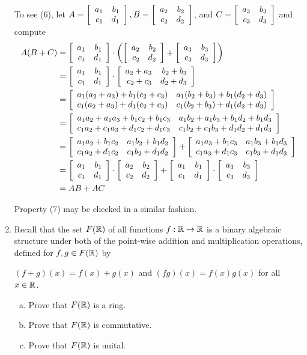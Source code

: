 \documentclass[11pt,fleqn,dvipsnames,usenames]{article}
\begin{document}
\begin{enumerate}[1.]
To see (6), let $A = \MATRIX{rr}{a_{1} & b_{1}\\c_{1} & d_{1}}, B = \MATRIX{rr}{a_{2} & b_{2}\\c_{2} & d_{2}}$, and $C = \MATRIX{rr}{a_{3} & b_{3}\\c_{3} & d_{3}}$ and compute
\begin{align*}
A(B+C) &= \MATRIX{rr}{a_{1} & b_{1}\\c_{1} & d_{1}} \cdot\left(\MATRIX{rr}{a_{2} & b_{2}\\c_{2} & d_{2}} + \MATRIX{rr}{a_{3} & b_{3}\\c_{3} & d_{3}}\right)\\
&= \MATRIX{rr}{a_{1} & b_{1}\\c_{1} & d_{1}} \cdot \MATRIX{rr}{a_{2} + a_{3} & b_{2} + b_{3}\\c_{2} + c_{3} & d_{2} + d_{3}}\\
&= \MATRIX{rr}{a_{1}(a_{2} + a_{3}) + b_{1}(c_{2} + c_{3}) & a_{1}(b_{2} + b_{3}) + b_{1}(d_{2} + d_{3})\\c_{1}(a_{2} + a_{3}) + d_{1}(c_{2} + c_{3}) & c_{1}(b_{2} + b_{3}) + d_{1}(d_{2} + d_{3})}\\
&= \MATRIX{rr}{a_{1}a_{2} + a_{1}a_{3} + b_{1}c_{2} + b_{1}c_{3} & a_{1}b_{2} + a_{1}b_{3} + b_{1}d_{2} + b_{1}d_{3}\\c_{1}a_{2} + c_{1}a_{3} + d_{1}c_{2} + d_{1}c_{3} & c_{1}b_{2} + c_{1}b_{3} + d_{1}d_{2} + d_{1}d_{3}}\\
&= \MATRIX{rr}{a_{1}a_{2} + b_{1}c_{2} & a_{1}b_{2} + b_{1}d_{2}\\c_{1}a_{2} + d_{1}c_{2} & c_{1}b_{2} + d_{1}d_{2}} + \MATRIX{rr}{a_{1}a_{3} +  b_{1}c_{3} & a_{1}b_{3} + b_{1}d_{3}\\c_{1}a_{3} + d_{1}c_{3} & c_{1}b_{3} + d_{1}d_{3}}\\
&= \MATRIX{rr}{a_{1} & b_{1}\\c_{1} & d_{1}}\cdot \MATRIX{rr}{a_{2} & b_{2}\\c_{2} & d_{2}} + \MATRIX{rr}{a_{1} & b_{1}\\c_{1} & d_{1}}\cdot \MATRIX{rr}{a_{3} & b_{3}\\c_{3} & d_{3}}\\
&= AB + AC
\end{align*}

Property (7) may be checked in a similar fashion.

\item Recall that the set $F(\R)$ of all functions $f:\R\to\R$ is a binary algebraic structure under both of the point-wise addition and multiplication operations, defined for $f,g\in F(\R)$ by
\begin{center}
$(f+g)(x) = f(x) + g(x)$ and $(fg)(x) = f(x)g(x)$ for all $x\in \R$.
\end{center}
\begin{enumerate}[(a)]
\item Prove that $F(\R)$ is a ring.
\item Prove that $F(\R)$ is commutative.
\item Prove that $F(\R)$ is unital.
\end{enumerate}
\vsmsp


\end{enumerate}
\end{document}
